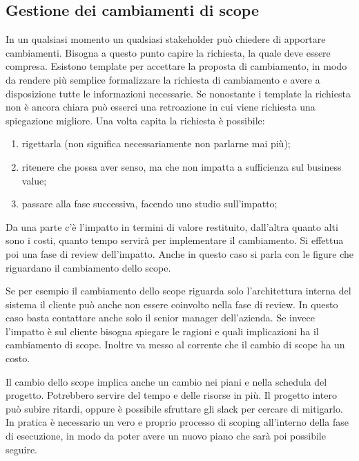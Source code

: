 \subsection{Gestione dei cambiamenti di scope}
In un qualsiasi momento un qualsiasi stakeholder può chiedere di apportare cambiamenti. Bisogna a questo punto capire la richiesta, la quale deve essere compresa. Esistono template per accettare la proposta di cambiamento, in modo da rendere più semplice formalizzare la richiesta di cambiamento e avere a disposizione tutte le informazioni necessarie. Se nonostante i template la richiesta non è ancora chiara può esserci una retroazione in cui viene richiesta una spiegazione migliore.
Una volta capita la richiesta è possibile:
\begin{enumerate}
	\item rigettarla (non significa necessariamente non parlarne mai più);
	\item ritenere che possa aver senso, ma che non impatta a sufficienza sul business value;
	\item passare alla fase successiva, facendo uno studio sull'impatto;
\end{enumerate}
Da una parte c'è l'impatto in termini di valore restituito, dall'altra quanto alti sono i costi, quanto tempo servirà per implementare il cambiamento. Si effettua poi una fase di review dell'impatto. Anche in questo caso si parla con le figure che riguardano il cambiamento dello scope.
\begin{info}
	Se per esempio il cambiamento dello scope riguarda solo l'architettura interna del sistema il cliente può anche non essere coinvolto nella fase di review. In questo caso basta contattare anche solo il senior manager dell'azienda.\newline
	\noindent Se invece l'impatto è sul cliente bisogna spiegare le ragioni e quali implicazioni ha il cambiamento di scope. Inoltre va messo al corrente che il cambio di scope ha un costo.
\end{info}
Il cambio dello scope implica anche un cambio nei piani e nella schedula del progetto. Potrebbero servire del tempo e delle risorse in più. Il progetto intero può subire ritardi, oppure è possibile sfruttare gli slack per cercare di mitigarlo. In pratica è necessario un vero e proprio processo di scoping all'interno della fase di esecuzione, in modo da poter avere un nuovo piano che sarà poi possibile seguire.

